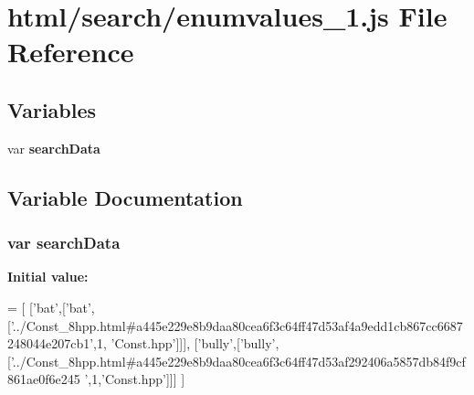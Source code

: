 \section{html/search/enumvalues\-\_\-1.js File Reference}
\label{enumvalues__1_8js}
\subsection*{Variables}
\begin{DoxyCompactItemize}
\item 
var {\bf search\-Data}
\end{DoxyCompactItemize}


\subsection{Variable Documentation}
\subsubsection[{search\-Data}]{\setlength{\rightskip}{0pt plus 5cm}var search\-Data}\label{enumvalues__1_8js_ad01a7523f103d6242ef9b0451861231e}
{\bfseries Initial value\-:}
\begin{DoxyCode}
=
[
  [\textcolor{stringliteral}{'bat'},[\textcolor{stringliteral}{'bat'},[\textcolor{stringliteral}{'../Const\_8hpp.html#a445e229e8b9daa80cea6f3c64ff47d53af4a9edd1cb867cc6687248044e207cb1'},1,\textcolor{stringliteral}{
      'Const.hpp'}]]],
  [\textcolor{stringliteral}{'bully'},[\textcolor{stringliteral}{'bully'},[\textcolor{stringliteral}{'../Const\_8hpp.html#a445e229e8b9daa80cea6f3c64ff47d53af292406a5857db84f9cf861ae0f6e245
      '},1,\textcolor{stringliteral}{'Const.hpp'}]]]
]
\end{DoxyCode}
